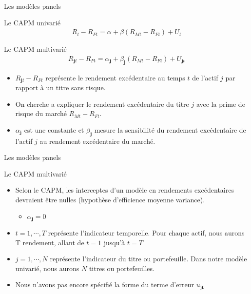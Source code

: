 \documentclass{beamer}
\begin{document}
\begin{frame}{Les modèles panels}
\begin{block}{Le CAPM univarié}
\begin{align*}
R_{t}-R_{Ft}=\alpha+\beta (R_{Mt}-R_{Ft})+U_{t}
\end{align*}
\end{block}
\begin{block}{Le CAPM multivarié}
\begin{align*}
R_{\textbf{j}t}-R_{Ft}=\alpha_{\textbf{j}}+\beta_{\textbf{j}} (R_{Mt}-R_{Ft})+U_{\textbf{j}t}
\end{align*}
\begin{itemize}
\item $R_{\textbf{j}t}-R_{Ft}$ représente le rendement excédentaire au temps $t$ de l'actif $j$ par rapport à un titre sans risque.
\item On cherche a expliquer le rendement excédentaire du titre $j$ avec la prime de risque du marché $R_{Mt}-R_{Ft}$.
\item $\alpha_{\textbf{j}}$ est une constante et $\beta_{\textbf{j}}$ mesure la sensibilité du rendement excédentaire de l'actif $j$ au rendement excédentaire du marché.
\end{itemize}
\end{block}
\end{frame}


\begin{frame}{Les modèles panels}

\begin{block}{Le CAPM multivarié}
\begin{itemize}
\item Selon le CAPM, les interceptes d’un modèle en rendements excédentaires devraient être nulles (hypothèse d’efficience moyenne variance).
\begin{itemize}
\item $\alpha_{\textbf{j}}=0$ 
\end{itemize}
\item $t=1,\cdots, T$ représente l'indicateur temporelle. Pour chaque actif, nous aurons T rendement, allant de $t=1$ jusqu'à $t=T$
\item $j=1, \cdots,N$ représente l'indicateur du titre ou portefeuille. Dans notre modèle univarié, nous aurons $N$ titres ou portefeuilles.
\item Nous n’avons pas encore spécifié la forme du terme d’erreur $u_{\textbf{jt}}$ 
\end{itemize}
\end{block}
\end{frame}
\end{document}
